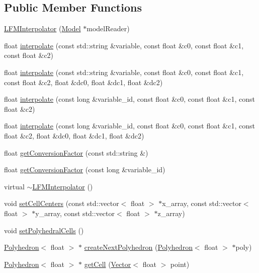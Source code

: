 \subsection*{Public Member Functions}
\begin{DoxyCompactItemize}
\item 
\hyperlink{classccmc_1_1_l_f_m_interpolator_a04218c8ff9c0a3703cd3d9cc870dfd4a}{L\-F\-M\-Interpolator} (\hyperlink{classccmc_1_1_model}{Model} $\ast$model\-Reader)
\item 
float \hyperlink{classccmc_1_1_l_f_m_interpolator_a1d6356a51024075b873e7966abd418f0}{interpolate} (const std\-::string \&variable, const float \&c0, const float \&c1, const float \&c2)
\item 
float \hyperlink{classccmc_1_1_l_f_m_interpolator_ab895be1e681fc9af63d9ae8916660077}{interpolate} (const std\-::string \&variable, const float \&c0, const float \&c1, const float \&c2, float \&dc0, float \&dc1, float \&dc2)
\item 
float \hyperlink{classccmc_1_1_l_f_m_interpolator_a022c2cc8c060c912bc9e07d9b05804d9}{interpolate} (const long \&variable\-\_\-id, const float \&c0, const float \&c1, const float \&c2)
\item 
float \hyperlink{classccmc_1_1_l_f_m_interpolator_aafa40bcb1aae6e232bc9b883cc8df160}{interpolate} (const long \&variable\-\_\-id, const float \&c0, const float \&c1, const float \&c2, float \&dc0, float \&dc1, float \&dc2)
\item 
float \hyperlink{classccmc_1_1_l_f_m_interpolator_aeb1ac07b468b3b046ddd4150f9a38426}{get\-Conversion\-Factor} (const std\-::string \&)
\item 
float \hyperlink{classccmc_1_1_l_f_m_interpolator_a4b5c75b22aefefbc7a68d8398776f3bc}{get\-Conversion\-Factor} (const long \&variable\-\_\-id)
\item 
virtual \hyperlink{classccmc_1_1_l_f_m_interpolator_a77c25b31fb9fa25752a7337cbfde0a77}{$\sim$\-L\-F\-M\-Interpolator} ()
\item 
void \hyperlink{classccmc_1_1_l_f_m_interpolator_a7cc7863edac1024b645e199058ad0d80}{set\-Cell\-Centers} (const std\-::vector$<$ float $>$ $\ast$x\-\_\-array, const std\-::vector$<$ float $>$ $\ast$y\-\_\-array, const std\-::vector$<$ float $>$ $\ast$z\-\_\-array)
\item 
void \hyperlink{classccmc_1_1_l_f_m_interpolator_a74c1ba35f8eaece3f44393538c23300d}{set\-Polyhedral\-Cells} ()
\item 
\hyperlink{classccmc_1_1_polyhedron}{Polyhedron}$<$ float $>$ $\ast$ \hyperlink{classccmc_1_1_l_f_m_interpolator_afbbebbeee5068e425c2deede2a30ebfc}{create\-Next\-Polyhedron} (\hyperlink{classccmc_1_1_polyhedron}{Polyhedron}$<$ float $>$ $\ast$poly)
\item 
\hyperlink{classccmc_1_1_polyhedron}{Polyhedron}$<$ float $>$ $\ast$ \hyperlink{classccmc_1_1_l_f_m_interpolator_a872043562f23728bbf389cfafb004a6f}{get\-Cell} (\hyperlink{classccmc_1_1_vector}{Vector}$<$ float $>$ point)
\end{DoxyCompactItemize}

